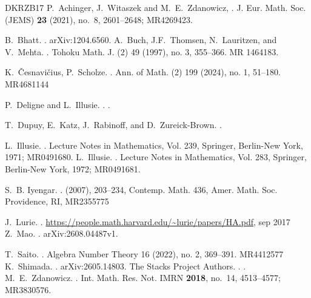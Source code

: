 \documentclass[11pt, a4paper]{amsart}
\theoremstyle{plain}
\theoremstyle{definition}
\begin{document}
\begin{thebibliography}{DKRZB17}
P.~Achinger, J.~Witaszek and M.~E.~Zdanowicz, 
.
\newblock J. Eur. Math. Soc. (JEMS) {\bf 23} (2021), no.~8, 2601--2648; MR4269423.

B.~Bhatt.
.
\newblock arXiv:1204.6560.
A.~Buch, J.F.~Thomsen, N.~Lauritzen, and V.~Mehta.
.
\newblock Tohoku Math. J. (2) 49 (1997), no. 3, 355–366. MR 1464183.

K.~Česnavičius, P.~Scholze.
.
\newblock Ann. of Math. (2) 199 (2024), no. 1, 51--180. MR4681144

 P.~Deligne and L.~Illusie.
 .
 .
 
T.~Dupuy, E.~Katz, J.~Rabinoff, and D.~Zureick-Brown.
.

L.~Illusie.
. \newblock Lecture Notes in Mathematics, Vol. 239, Springer, Berlin-New York, 1971; MR0491680.
L.~Illusie.
.
\newblock Lecture Notes in Mathematics, Vol. 283, Springer, Berlin-New York, 1972; MR0491681.

S.~B. Iyengar.
.
 (2007), 203--234, Contemp. Math. 436, Amer. Math. Soc. Providence, RI,  MR2355775

J.~Lurie.
.
\newblock
{\url{https://people.math.harvard.edu/~lurie/papers/HA.pdf}, sep 2017}
Z.~Mao.
.
\newblock  arXiv:2608.04487v1.

T.~Saito.
.
\newblock Algebra Number Theory 16 (2022), no. 2, 369–391. MR4412577
K.~Shimada.
.
\newblock arXiv:2605.14803. 
The Stacks Project Authors.
.
.
M.~E.~Zdanowicz.
.
\newblock Int. Math. Res. Not. IMRN {\bf 2018}, no.~14, 4513--4577; MR3830576.
\end{thebibliography}
\end{document}
